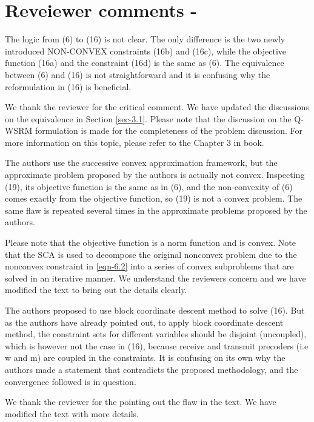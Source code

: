 \section*{Reveiewer comments - }

\begin{itemize}

 The logic from (6) to (16) is not clear. The only difference is the two newly introduced NON-CONVEX constraints (16b) and (16c), while the objective function (16a) and the constraint (16d) is the same as (6). The equivalence between (6) and (16) is not straightforward and it is confusing why the reformulation in (16) is beneficial.

\resp We thank the reviewer for the critical comment. We have updated the discussions on the equivalence in Section \ref{sec-3.1}. Please note that the discussion on the \ac{Q-WSRM} formulation is made for the completeness of the problem discussion. For more information on this topic, please refer to the Chapter 3 in \cite{neely2010stochastic} book.

 The authors use the successive convex approximation framework, but the approximate problem proposed by the authors is actually not convex. Inspecting (19), its objective function is the same as in (6), and the non-convexity of (6) comes exactly from the objective function, so (19) is not a convex problem. The same flaw is repeated several times in the approximate problems proposed by the authors.

\resp Please note that the objective function is a norm function and is convex. Note that the \ac{SCA} is used to decompose the original nonconvex problem due to the nonconvex constraint in \eqref{eqn-6.2} into a series of convex subproblems that are solved in an iterative manner. We understand the reviewers concern and we have modified the text to bring out the details clearly.

 The authors proposed to use block coordinate descent method to solve (16). But as the authors have already pointed out, to apply block coordinate descent method, the constraint sets for different variables should be disjoint (uncoupled), which is however not the case in (16), because receive and transmit precoders (i.e w and m) are coupled in the constraints. It is confusing on its own why the authors made a statement that contradicts the proposed methodology, and the convergence followed is in question.

\resp We thank the reviewer for the pointing out the flaw in the text. We have modified the text with more details.


\end{itemize}
